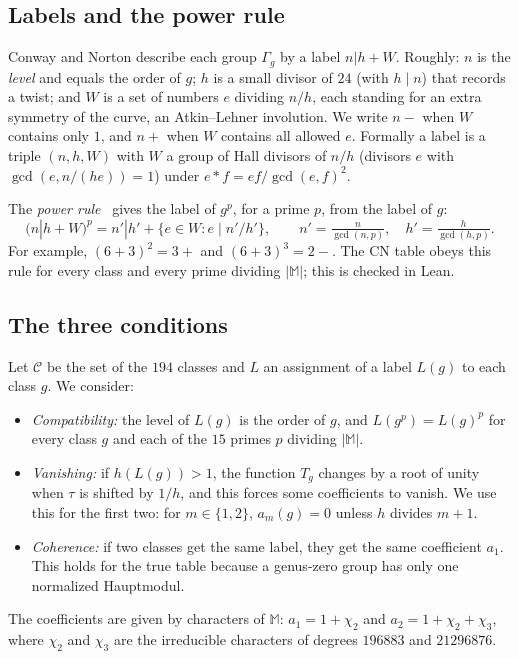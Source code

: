 \documentclass[11pt]{amsart}
\theoremstyle{definition}
\newcommand{\M}{\mathbb{M}}
\newcommand{\cl}{\mathcal{C}}
\begin{document}
\subsection{Labels and the power rule}
Conway and Norton describe each group $\Gamma_g$ by a label $n|h+W$. Roughly: $n$ is the \emph{level} and equals the order of $g$; $h$ is a small divisor of $24$ (with $h\mid n$) that records a twist; and $W$ is a set of numbers $e$ dividing $n/h$, each standing for an extra symmetry of the curve, an Atkin--Lehner involution. We write $n-$ when $W$ contains only $1$, and $n+$ when $W$ contains all allowed $e$. Formally a label is a triple $(n,h,W)$ with $W$ a group of Hall divisors of $n/h$ (divisors $e$ with $\gcd(e,n/(he))=1$) under $e*f=ef/\gcd(e,f)^2$.

The \emph{power rule}~\cite[\S6]{CN79} gives the label of $g^p$, for a prime $p$, from the label of $g$:
\[
(n|h+W)^p=n'|h'+\{e\in W: e\mid n'/h'\},\qquad n'=\tfrac{n}{\gcd(n,p)},\quad h'=\tfrac{h}{\gcd(h,p)}.
\]
For example, $(6+3)^2=3+$ and $(6+3)^3=2-$. The CN table obeys this rule for every class and every prime dividing $|\M|$; this is checked in Lean.

\subsection{The three conditions}
Let $\cl$ be the set of the $194$ classes and $L$ an assignment of a label $L(g)$ to each class $g$. We consider:
\begin{itemize}
\item[(C)] \emph{Compatibility:} the level of $L(g)$ is the order of $g$, and $L(g^p)=L(g)^p$ for every class $g$ and each of the $15$ primes $p$ dividing $|\M|$.
\item[(V)] \emph{Vanishing:} if $h(L(g))>1$, the function $T_g$ changes by a root of unity when $\tau$ is shifted by $1/h$, and this forces some coefficients to vanish. We use this for the first two: for $m\in\{1,2\}$, $a_m(g)=0$ unless $h$ divides $m+1$.
\item[(H)] \emph{Coherence:} if two classes get the same label, they get the same coefficient $a_1$. This holds for the true table because a genus-zero group has only one normalized Hauptmodul.
\end{itemize}
The coefficients are given by characters of $\M$: $a_1=1+\chi_2$ and $a_2=1+\chi_2+\chi_3$, where $\chi_2$ and $\chi_3$ are the irreducible characters of degrees $196883$ and $21296876$.
\end{document}

